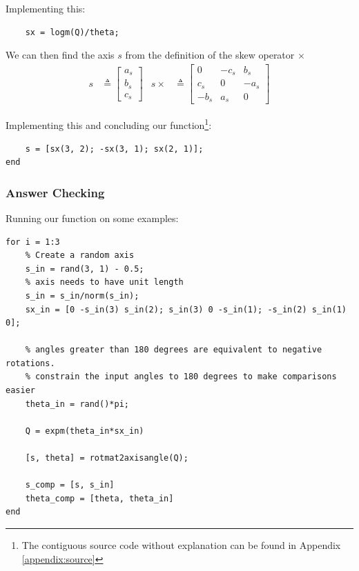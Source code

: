 \documentclass[11pt]{article}
\begin{document}
Implementing this:
\begin{verbatim}
    sx = logm(Q)/theta;
\end{verbatim}

We can then find the axis \(s\) from the definition of the skew operator \(\times\)
\begin{align*}
s
&\triangleq
\begin{bmatrix}
a_s \\ b_s \\ c_s
\end{bmatrix}
&
s\times
&\triangleq
\begin{bmatrix}
0    & -c_s & b_s  \\
c_s  & 0    & -a_s \\
-b_s & a_s  & 0
\end{bmatrix}
\end{align*}

Implementing this and concluding our function\footnote{The contiguous source code without explanation can be found in Appendix \ref{appendix:source}}:
\begin{verbatim}
    s = [sx(3, 2); -sx(3, 1); sx(2, 1)];
end
\end{verbatim}





\subsubsection{Answer Checking}
\label{sec:org39f40e6}
Running our function on some examples:
\begin{verbatim}
for i = 1:3
    % Create a random axis
    s_in = rand(3, 1) - 0.5;
    % axis needs to have unit length
    s_in = s_in/norm(s_in);
    sx_in = [0 -s_in(3) s_in(2); s_in(3) 0 -s_in(1); -s_in(2) s_in(1) 0];

    % angles greater than 180 degrees are equivalent to negative rotations.
    % constrain the input angles to 180 degrees to make comparisons easier
    theta_in = rand()*pi;

    Q = expm(theta_in*sx_in)

    [s, theta] = rotmat2axisangle(Q);

    s_comp = [s, s_in]
    theta_comp = [theta, theta_in]
end
\end{verbatim}
\end{document}
